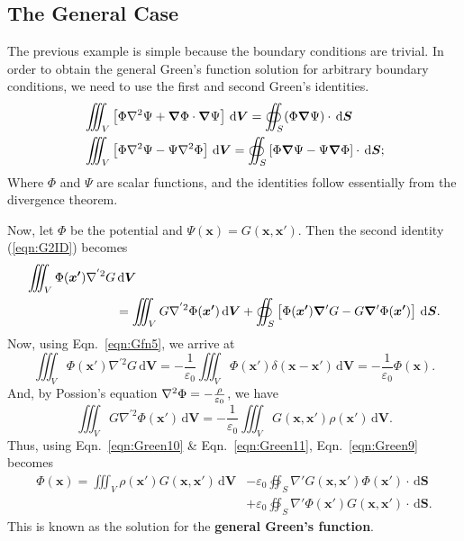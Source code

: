 \documentclass[12pt,english]{article}
\newcommand{\dmr}[1]{\, \mathrm{d}#1} %
\renewcommand{\vec}[1]{\boldsymbol{#1}}
\begin{document}
\subsection{The General Case}
The previous example is simple because the boundary conditions are trivial. In order to obtain the general Green's function solution for arbitrary boundary conditions, we need to use the first and second Green's identities.
\begin{subequations}
    \begin{align}
         & \iiint_{V}\left[\Phi\laplacian\Psi + \grad\Phi \cdot \grad\Psi\right] \dmr{\vec{V}} = \oiint_S (\Phi\grad\Psi)\cdot\dmr{\vec{S}} \label{eqn:G1ID}                          \\
         & \iiint_{V}\left[\Phi\laplacian\Psi - \Psi\laplacian\Phi\right] \dmr{\vec{V}} = \oiint_S \left[ \Phi\grad\Psi - \Psi\grad\Phi \right] \cdot \dmr{\vec{S}}; \label{eqn:G2ID}
    \end{align}
\end{subequations}
Where $\Phi$ and $\Psi$ are scalar functions, and the identities follow essentially from the divergence theorem.

Now, let $\Phi$ be the potential and $\Psi(\vec{x}) = G(\vec{x}, \vec{x'})$. Then the second identity (\ref{eqn:G2ID}) becomes
\begin{equation}
    \begin{split}
        \iiint_{V} \Phi(\vec{x'}) \nabla^{'2} G &\dmr{\vec{V}} \\
        &= \iiint_{V} G \nabla^{'2} \Phi(\vec{x'}) \dmr{\vec{V}} + \oiint_S \left[ \Phi(\vec{x'}) \grad' G - G\grad'\Phi(\vec{x'})  \right] \dmr{\vec{S}}. \label{eqn:Green9}
    \end{split}
\end{equation}
Now, using Eqn.~\ref{eqn:Gfn5}, we arrive at
\begin{equation}
    \iiint_{V} \Phi(\vec{x'}) \nabla^{'2} G \dmr{\vec{V}} = -\frac{1}{\varepsilon_0}\iiint_V \Phi(\vec{x'})\delta(\vec{x}-\vec{x'})\dmr{\vec{V}} = -\frac{1}{\varepsilon_0}\Phi(\vec{x}). \label{eqn:Green10}
\end{equation}
And, by Possion's equation $\laplacian\Phi = - \frac{\rho}{\varepsilon_0}$, we have
\begin{equation}
    \iiint_{V} G \nabla^{'2} \Phi(\vec{x'}) \dmr{\vec{V}} = -\frac{1}{\varepsilon_0}\iiint_V G(\vec{x},\vec{x'})\rho(\vec{x'})\dmr{\vec{V}}. \label{eqn:Green11}
\end{equation}
Thus, using Eqn.~\ref{eqn:Green10} \& Eqn.~\ref{eqn:Green11}, Eqn.~\ref{eqn:Green9} becomes
\begin{equation}
    \begin{split}
        \Phi(\vec{x}) = \iiint_V \rho(\vec{x'})G(\vec{x}, \vec{x'}) \dmr{\vec{V}} &- \varepsilon_0 \oiint_S\nabla'G(\vec{x}, \vec{x'})\Phi(\vec{x'})\cdot\dmr{\vec{S}}\\
        &+ \varepsilon_0\oiint_S\nabla'\Phi(\vec{x'})G(\vec{x}, \vec{x'})\cdot\dmr{\vec{S}}. \label{eqn:GenGreenSol}
    \end{split}
\end{equation}
This is known as the solution for the \textbf{general Green's function}.
\end{document}
